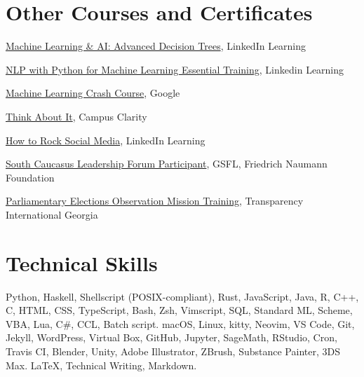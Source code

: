 \documentclass[a4paper,10pt,sans]{moderncv}
\begin{document}


\section{Other Courses and Certificates}
         {\href{https://www.linkedin.com/learning/machine-learning-ai-advanced-decision-trees}{Machine Learning \& AI: Advanced Decision Trees}, LinkedIn Learning}

         {\href{https://www.linkedin.com/learning/nlp-with-python-for-machine-learning-essential-training}{NLP with Python for Machine Learning Essential Training}, Linkedin Learning}

         {\href{https://developers.google.com/machine-learning/crash-course/}{Machine Learning Crash Course}, Google}

         {\href{https://www.davidoniani.com/assets/certificates/campus-clarity.jpg}{Think About It}, Campus Clarity}

         {\href{http://www.linkedin.com/learning/how-to-rock-social-media}{How to Rock Social Media}, LinkedIn Learning}

         {\href{https://www.davidoniani.com/assets/certificates/south-caucasus-leadership-forum-2016.jpg}{South Caucasus Leadership Forum Participant}, GSFL, Friedrich Naumann Foundation}

         {\href{https://www.transparency.ge/en}{Parliamentary Elections Observation Mission Training}, Transparency International Georgia}


\section{Technical Skills}
         {Python, Haskell, Shellscript (POSIX-compliant), Rust, JavaScript,
          Java, R, C++, C, HTML, CSS, TypeScript, Bash, Zsh, Vimscript,
          SQL, Standard ML, Scheme, VBA, Lua, C\#, CCL, Batch script.}
         {macOS, Linux, kitty, Neovim, VS Code, Git, Jekyll, WordPress,
          Virtual Box, GitHub, Jupyter, SageMath, RStudio, Cron, Travis CI,
          Blender, Unity, Adobe Illustrator, ZBrush, Substance Painter,
          3DS Max.}
         {\LaTeX, Technical Writing, Markdown.}
\end{document}
